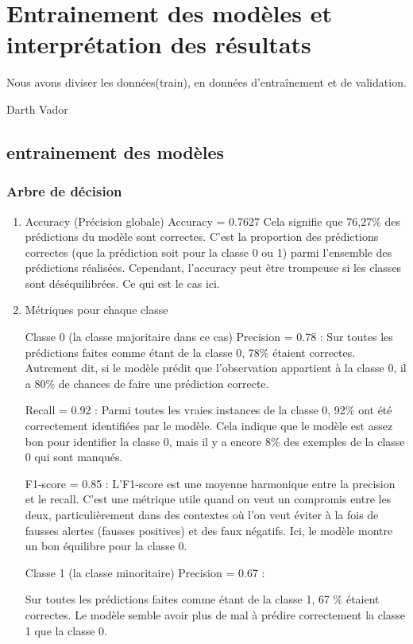 
\chapter{Entrainement des modèles et interprétation des résultats }
\epigraph{ Nous avons diviser les données(train), en données d'entraînement et de validation.}{Darth Vador}
\minitoc
\newpage
\section{entrainement des modèles}
\subsection{Arbre de décision}

\begin{enumerate}
\item Accuracy (Précision globale)
Accuracy = 0.7627
Cela signifie que 76,27\% des prédictions du modèle sont correctes. C'est la proportion des prédictions correctes (que la prédiction soit pour la classe 0 ou 1) parmi l'ensemble des prédictions réalisées. Cependant, l'accuracy peut être trompeuse si les classes sont déséquilibrées. Ce qui est le cas ici.

\item Métriques pour chaque classe

Classe 0 (la classe majoritaire dans ce cas)
Precision = 0.78 :
Sur toutes les prédictions faites comme étant de la classe 0, 78\% étaient correctes. Autrement dit, si le modèle prédit que l'observation appartient à la classe 0, il a 80\% de chances de faire une prédiction correcte.

Recall = 0.92 :
Parmi toutes les vraies instances de la classe 0, 92\% ont été correctement identifiées par le modèle. Cela indique que le modèle est assez bon pour identifier la classe 0, mais il y a encore 8\% des exemples de la classe 0 qui sont manqués.

F1-score = 0.85 :
L'F1-score est une moyenne harmonique entre la precision et le recall. C'est une métrique utile quand on veut un compromis entre les deux, particulièrement dans des contextes où l'on veut éviter à la fois de fausses alertes (fausses positives) et des faux négatifs. Ici, le modèle montre un bon équilibre pour la classe 0.

Classe 1 (la classe minoritaire)
Precision = 0.67 :

Sur toutes les prédictions faites comme étant de la classe 1, 67 \% étaient correctes. Le modèle semble avoir plus de mal à prédire correctement la classe 1 que la classe 0.


\end{enumerate}
